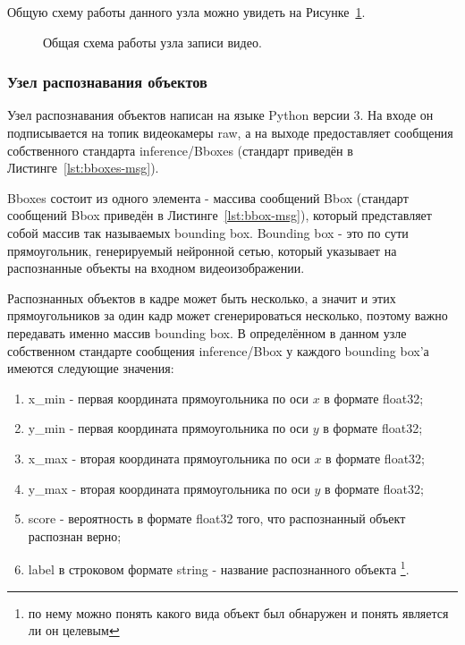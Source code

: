 Общую схему работы данного узла можно увидеть на Рисунке~\ref{fig:node-recorder}.

\begin{figure}[ht]
  \caption{Общая схема работы узла записи видео.}\label{fig:node-recorder}
\end{figure}

\subsubsection{Узел распознавания объектов}
Узел распознавания объектов написан на языке Python версии 3. На входе он подписывается на топик видеокамеры raw, а на выходе предоставляет сообщения собственного стандарта inference/Bboxes (стандарт приведён в Листинге~\ref{lst:bboxes-msg}). 

Bboxes состоит из одного элемента - массива сообщений Bbox (стандарт сообщений Bbox приведён в Листинге~\ref{lst:bbox-msg}), который представляет собой массив так называемых bounding box. Bounding box - это по сути прямоугольник, генерируемый нейронной сетью, который указывает на распознанные объекты на входном видеоизображении. 

Распознанных объектов в кадре может быть несколько, а значит и этих прямоугольников за один кадр может сгенерироваться несколько, поэтому важно передавать именно массив bounding box. В определённом в данном узле собственном стандарте сообщения inference/Bbox у каждого bounding box'а имеются следующие значения:

\begin{enumerate}
\item x\_min - первая координата прямоугольника по оси $x$ в формате float32;
\item y\_min - первая координата прямоугольника по оси $y$ в формате float32;
\item x\_max - вторая координата прямоугольника по оси $x$ в формате float32;
\item y\_max - вторая координата прямоугольника по оси $y$ в формате float32;
\item score - вероятность в формате float32 того, что распознанный объект распознан верно;
\item label в строковом формате string - название распознанного объекта \footnote{по нему можно понять какого вида объект был обнаружен и понять является ли он целевым}.
\end{enumerate}

